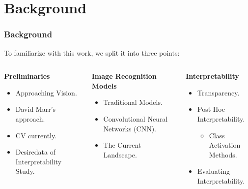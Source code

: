 \section{Background}
\begin{frame}[t]
    \frametitle{Background}
    To familiarize with this work, we split it into three points:\\\pause
    \begin{columns}[t]
        \begin{center}
            \footnotesize\textbf{Preliminaries}\\
            \begin{itemize}
                \footnotesize\item Approaching Vision.
                \footnotesize\item David Marr's approach.
                \footnotesize\item CV currently.
                \footnotesize\item Desiredata of Interpretability Study.
            \end{itemize}
        \end{center}
        \begin{center}
            \footnotesize\textbf{Image Recognition Models}\\
            \begin{itemize}
                \footnotesize\item Traditional Models.
                \footnotesize\item Convolutional Neural Networks (CNN).
                \footnotesize\item The Current Landscape.
            \end{itemize}
        \end{center}
        \begin{center}
            \footnotesize\textbf{Interpretability}\\
            \begin{itemize}
                \footnotesize\item Transparency.
                \footnotesize\item Post-Hoc Interpretability.
                \begin{itemize}
                    \footnotesize\item Class Activation Methods.
                \end{itemize}
                \footnotesize\item Evaluating Interpretability.
            \end{itemize}
        \end{center}
    \end{columns}            
\end{frame}



